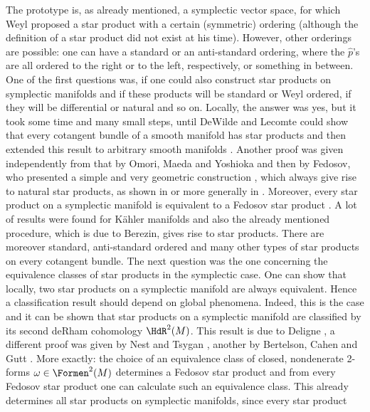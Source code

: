 The prototype is, as already mentioned, a symplectic vector space, for which 
Weyl proposed a star product with a certain (symmetric) ordering (although the 
definition of a star product did not exist at his time). However, other 
orderings are possible: one can have a standard or an anti-standard ordering, 
where the $\hat p$'s are all ordered to the right or to the left, respectively, or 
something in  between. One of the first questions was, if one could also construct 
star products on symplectic manifolds and if these products will be standard or 
Weyl ordered, if they will be differential or natural and so on. Locally, the 
answer was yes, but it took some time and many small steps, until DeWilde and 
Lecomte could show that every cotangent bundle of a smooth manifold has star 
products \cite{dewilde.lecomte:1983a} and then extended this result to arbitrary 
smooth manifolds \cite{dewilde.lecomte:1983b}. Another proof was given 
independently from that by Omori, Maeda and Yoshioka 
\cite{omori.maeda.yoshioka:1991a} and then by Fedosov, who presented a simple 
and very geometric construction \cite{fedosov:1994a}, which always give rise to 
natural star products, as shown in \cite{bordemann.waldmann:1997a} 
or more generally in \cite{gutt.rawnsley:2003a}. Moreover, every star product on a 
symplectic manifold is equivalent to a Fedosov star product 
\cite{bertelson.cahen.gutt:1997a}. A lot of 
results were found for K\"ahler manifolds and also the already mentioned 
procedure, which is due to Berezin, gives rise to star products. There are 
moreover standard, anti-standard ordered and many other types of star products 
on every cotangent bundle. The next question was the one concerning the 
equivalence classes of star products in the symplectic case. One can show that 
locally, two star products on a symplectic manifold are always equivalent. Hence 
a classification result should depend on global phenomena. Indeed, this is the 
case and it can be shown that star products on a symplectic manifold are 
classified by its second deRham cohomology $\HdR^2(M)$. This result is due to 
Deligne \cite{deligne:1995a}, a different proof was given by Nest and Tsygan 
\cite{nest.tsygan:1995a, nest.tsygan:1995a}, another by Bertelson, Cahen and Gutt 
\cite{bertelson.cahen.gutt:1997a}. More exactly: the choice of an equivalence 
class of closed, nondenerate 2-forms $\omega \in \Formen^2(M)$ determines a 
Fedosov star product and from every Fedosov 
star product one can calculate such an equivalence class. This already 
determines all star products on symplectic manifolds, since every star product 
